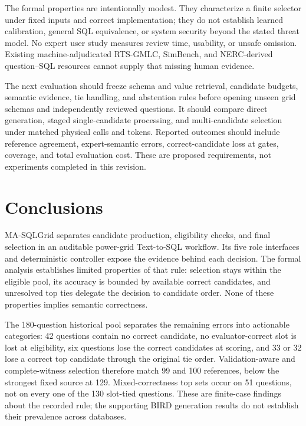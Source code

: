 \documentclass[information,article,submit,moreauthors]{Definitions/mdpi}
\newcommand{\masql}{MA-SQLGrid}
\begin{document}
The formal properties are intentionally modest. They characterize a finite selector under fixed inputs and correct implementation; they do not establish learned calibration, general SQL equivalence, or system security beyond the stated threat model. No expert user study measures review time, usability, or unsafe omission. Existing machine-adjudicated RTS-GMLC, SimBench, and NERC-derived question--SQL resources cannot supply that missing human evidence.

The next evaluation should freeze schema and value retrieval, candidate budgets, semantic evidence, tie handling, and abstention rules before opening unseen grid schemas and independently reviewed questions. It should compare direct generation, staged single-candidate processing, and multi-candidate selection under matched physical calls and tokens. Reported outcomes should include reference agreement, expert-semantic errors, correct-candidate loss at gates, coverage, and total evaluation cost. These are proposed requirements, not experiments completed in this revision.

\section{Conclusions}

\masql{} separates candidate production, eligibility checks, and final selection in an auditable power-grid Text-to-SQL workflow. Its five role interfaces and deterministic controller expose the evidence behind each decision. The formal analysis establishes limited properties of that rule: selection stays within the eligible pool, its accuracy is bounded by available correct candidates, and unresolved top ties delegate the decision to candidate order. None of these properties implies semantic correctness.

The 180-question historical pool separates the remaining errors into actionable categories: 42 questions contain no correct candidate, no evaluator-correct slot is lost at eligibility, six questions lose the correct candidates at scoring, and 33 or 32 lose a correct top candidate through the original tie order. Validation-aware and complete-witness selection therefore match 99 and 100 references, below the strongest fixed source at 129. Mixed-correctness top sets occur on 51 questions, not on every one of the 130 slot-tied questions. These are finite-case findings about the recorded rule; the supporting BIRD generation results do not establish their prevalence across databases.
\end{document}
